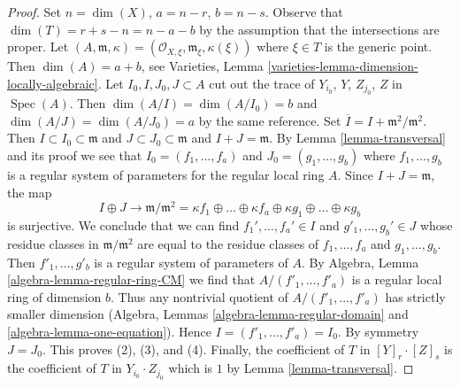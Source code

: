 \documentclass[10pt,a4paper]{amsart}
\theoremstyle{plain}
\theoremstyle{definition}
\theoremstyle{remark}
\numberwithin{equation}{subsection}
\def\Spec{\mathop{\mathrm{Spec}}}
\begin{document}
\begin{proof}
Set $n = \dim(X)$, $a = n - r$, $b = n - s$. Observe that
$\dim(T) = r + s - n = n - a - b$ by the assumption that the
intersections are proper. Let $(A, \mathfrak m, \kappa) =
(\mathcal{O}_{X, \xi}, \mathfrak m_\xi, \kappa(\xi))$ where $\xi \in T$
is the generic point. Then $\dim(A) = a + b$, see
Varieties, Lemma \ref{varieties-lemma-dimension-locally-algebraic}.
Let $I_0, I, J_0, J \subset A$ cut out the trace of
$Y_{i_0}$, $Y$, $Z_{j_0}$, $Z$ in $\Spec(A)$.
Then $\dim(A/I) = \dim(A/I_0) = b$ and $\dim(A/J) = \dim(A/J_0) = a$
by the same reference. Set $\overline{I} = I + \mathfrak m^2/\mathfrak m^2$.
Then $I \subset I_0 \subset \mathfrak m$ and
$J \subset J_0 \subset \mathfrak m$ and $I + J = \mathfrak m$.
By Lemma \ref{lemma-transversal} and its proof we see that
$I_0 = (f_1, \ldots, f_a)$ and $J_0 = (g_1, \ldots, g_b)$
where $f_1, \ldots, g_b$ is a regular system of parameters
for the regular local ring $A$. Since $I + J = \mathfrak m$, the map
$$
I \oplus J \to
\mathfrak m/\mathfrak m^2 =
\kappa f_1
\oplus \ldots \oplus
\kappa f_a
\oplus
\kappa g_1
\oplus \ldots \oplus
\kappa g_b
$$
is surjective. We conclude that we can find
$f_1', \ldots, f_a' \in I$ and $g'_1, \ldots, g_b' \in J$
whose residue classes in $\mathfrak m/\mathfrak m^2$ are equal to the
residue classes of $f_1, \ldots, f_a$ and $g_1, \ldots, g_b$.
Then $f'_1, \ldots, g'_b$ is a regular system of parameters of $A$.
By Algebra, Lemma \ref{algebra-lemma-regular-ring-CM} we find that
$A/(f'_1, \ldots, f'_a)$ is a regular local ring of dimension $b$.
Thus any nontrivial quotient of $A/(f'_1, \ldots, f'_a)$
has strictly smaller dimension
(Algebra, Lemmas \ref{algebra-lemma-regular-domain} and
\ref{algebra-lemma-one-equation}). Hence $I = (f'_1, \ldots, f'_a) = I_0$.
By symmetry $J = J_0$. This proves (2), (3), and (4).
Finally, the coefficient of $T$ in $[Y]_r \cdot [Z]_s$
is the coefficient of $T$ in $Y_{i_0} \cdot Z_{j_0}$ which is
$1$ by Lemma \ref{lemma-transversal}.
\end{proof}
\end{document}
